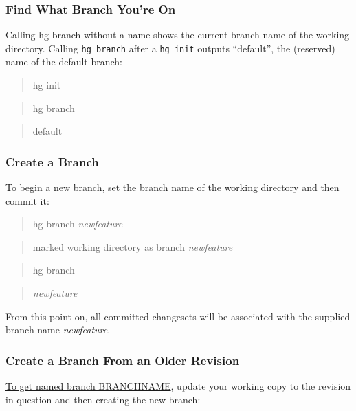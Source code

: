 \subsubsection{Find What Branch You're On}

Calling hg branch without a name shows the current branch name of
the working directory. Calling \verb!hg branch! after a
\verb!hg init! outputs ``default'', the (reserved) name of the
default branch:

\begin{quote}
hg init

\end{quote}
\begin{quote}
hg branch

\end{quote}
\begin{quote}
default

\end{quote}
\subsubsection{Create a Branch}

To begin a new branch, set the branch name of the working directory
and then commit it:

\begin{quote}
hg branch \emph{newfeature}

\end{quote}
\begin{quote}
marked working directory as branch \emph{newfeature}

\end{quote}
\begin{quote}
hg branch

\end{quote}
\begin{quote}
\emph{newfeature}

\end{quote}
From this point on, all committed changesets will be associated
with the supplied branch name \emph{newfeature}.

\subsubsection{Create a Branch From an Older Revision}

\href{http://stackoverflow.com/questions/13549931/create-a-new-branch-at-a-certain-revision}{To get named branch BRANCHNAME},
update your working copy to the revision in question and then
creating the new branch:

